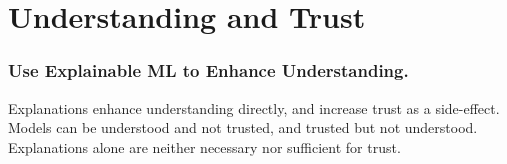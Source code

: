 \documentclass[11pt,
               aspectratio=169,
               hyperref={colorlinks}
               ]{beamer}
\begin{document}
	\section{Understanding and Trust}

	\begin{frame}
	
		\frametitle{Use Explainable ML to Enhance Understanding.}
		
		Explanations enhance understanding directly, and increase trust as a side-effect.\\
		\vspace{10pt}
		Models can be understood and not trusted, and trusted but not understood.\\
		\vspace{10pt}
		Explanations alone are neither necessary nor sufficient for trust.
		
	\end{frame}
\end{document}

